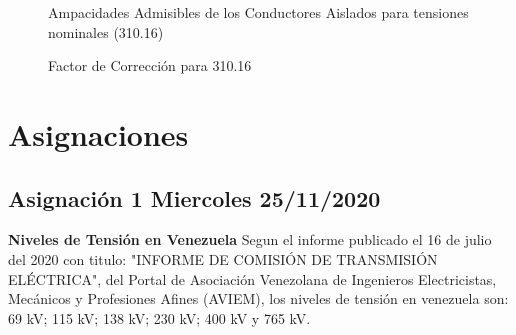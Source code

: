 \documentclass[11pt,letterpaper]{article}
\begin{document}
\begin{figure}[ht!]
	\centering
	\caption{Ampacidades Admisibles de los Conductores Aislados para tensiones nominales (310.16)}
\end{figure}

\begin{figure}[ht!]
	\centering
	\caption{Factor de Corrección para 310.16}
\end{figure}

\section{Asignaciones}
\subsection{Asignación 1 Miercoles 25/11/2020}
\textbf{Niveles de Tensión en Venezuela}
Segun el informe publicado el 16 de julio del 2020 con titulo: "INFORME DE COMISIÓN DE TRANSMISIÓN ELÉCTRICA", del Portal de Asociación Venezolana de Ingenieros Electricistas, Mecánicos y Profesiones Afines (AVIEM), los niveles de tensión en venezuela son: 69 kV; 115 kV; 138 kV; 230 kV; 400 kV y 765 kV.
\end{document}
